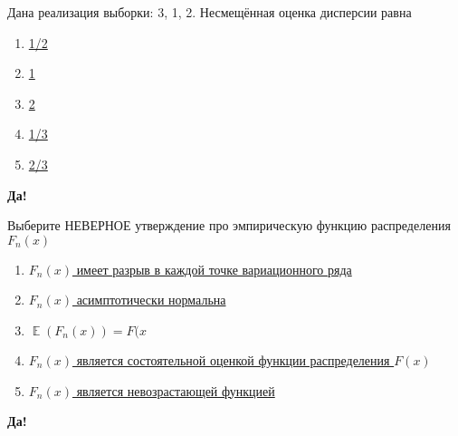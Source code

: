 \documentclass[t]{beamer}
\DeclareMathOperator{\E}{\mathbb{E}}
\begin{document}
 \begin{frame} \label{21-Yes} 
\begin{block}{21} 

  Дана реализация выборки: 3, 1, 2. Несмещённая оценка дисперсии равна
  


 \end{block} 
\begin{enumerate} 
\item[] \hyperlink{21-No}{\beamergotobutton{} 1/2}
\item[] \hyperlink{21-Yes}{\beamergotobutton{} 1}
\item[] \hyperlink{21-No}{\beamergotobutton{} 2}
\item[] \hyperlink{21-No}{\beamergotobutton{} 1/3}
\item[] \hyperlink{21-No}{\beamergotobutton{} 2/3}
\end{enumerate} 

 \textbf{Да!} 
 \hyperlink{22}{}\end{frame} 


 \begin{frame} \label{22-Yes} 
\begin{block}{22} 

  Выберите НЕВЕРНОЕ утверждение про эмпирическую функцию распределения $F_n(x)$
  


 \end{block} 
\begin{enumerate} 
\item[] \hyperlink{22-No}{\beamergotobutton{} $F_n(x)$ имеет разрыв в каждой точке вариационного ряда}
\item[] \hyperlink{22-No}{\beamergotobutton{} $F_n(x)$ асимптотически нормальна}
\item[] \hyperlink{22-No}{\beamergotobutton{} $\E(F_n(x))=F(x$}
\item[] \hyperlink{22-No}{\beamergotobutton{} $F_n(x)$ является состоятельной оценкой функции распределения $F(x)$}
\item[] \hyperlink{22-Yes}{\beamergotobutton{} $F_n(x)$ является невозрастающей функцией}
\end{enumerate} 

 \textbf{Да!} 
 \hyperlink{23}{}\end{frame} 
\end{document}
